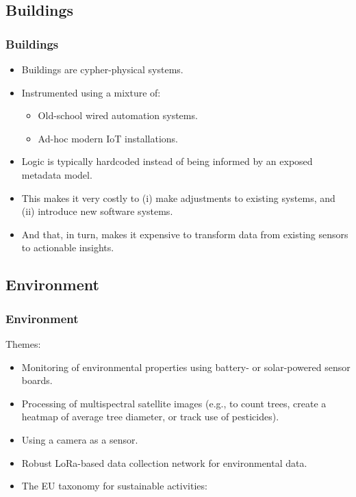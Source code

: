 \subsection{Buildings}
\begin{frame}
    \frametitle{Buildings}
    \vspace{3mm}
    \begin{itemize}
        \item Buildings are cypher-physical systems.
        \item Instrumented using a mixture of:
          \begin{itemize}
            \item Old-school wired automation systems.
            \item Ad-hoc modern IoT installations.
          \end{itemize}
        \item Logic is typically hardcoded instead of being informed by an exposed metadata model.
        \item This makes it very costly to (i) make adjustments to existing systems, and (ii) introduce new software systems.
        \item And that, in turn, makes it expensive to transform data from existing sensors to actionable insights.
    \end{itemize}
\end{frame}

\subsection{Environment}
\begin{frame}
    \frametitle{Environment}
    \vspace{3mm}
    Themes:
    \begin{itemize}
        \item Monitoring of environmental properties using battery- or solar-powered sensor boards.
        \item Processing of multispectral satellite images (e.g., to count trees, create a heatmap of average tree diameter, or track use of pesticides).
        \item Using a camera as a sensor.
        \item Robust LoRa-based data collection network for environmental data.
        \item The EU taxonomy for sustainable activities:
          \\
    \end{itemize}
\end{frame}

